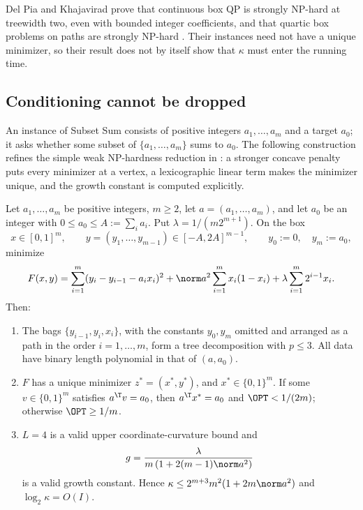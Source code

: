 Del Pia and Khajavirad prove that continuous box QP is strongly NP-hard at
treewidth two, even with bounded integer coefficients, and that quartic box
problems on paths are strongly NP-hard \cite{DelPiaKhajavirad2026}. Their
instances need not have a unique minimizer, so their result does not by
itself show that $\kappa$ must enter the running time.

\subsection{Conditioning cannot be dropped}\label{sec:limits-conditioning}

An instance of Subset Sum consists of positive integers $a_1,\ldots,a_m$ and
a target $a_0$; it asks whether some subset of $\{a_1,\ldots,a_m\}$ sums to
$a_0$. The following construction refines the simple weak NP-hardness
reduction in \cite[Remark~2]{DelPiaKhajavirad2026}: a stronger concave penalty
puts every minimizer at a vertex, a lexicographic linear term makes the
minimizer unique, and the growth constant is computed explicitly.

\begin{proposition}\label{lim:prop:unique}
Let $a_1,\ldots,a_m$ be positive integers, $m\ge2$, let $a=(a_1,\ldots,a_m)$,
and let $a_0$ be an integer with $0\le a_0\le A:=\sum_ia_i$. Put
$\lambda=1/(m2^{m+1})$. On the box
\[
x\in[0,1]^m,\qquad y=(y_1,\ldots,y_{m-1})\in[-A,2A]^{m-1},
\qquad y_0:=0,\quad y_m:=a_0,
\]
minimize
\[
F(x,y)=\sum_{i=1}^m(y_i-y_{i-1}-a_ix_i)^2
+\norm a^2\sum_{i=1}^mx_i(1-x_i)+\lambda\sum_{i=1}^m2^{i-1}x_i .
\]
Then:
\begin{enumerate}
\item The bags $\{y_{i-1},y_i,x_i\}$, with the constants $y_0,y_m$ omitted
  and arranged as a path in the order $i=1,\ldots,m$, form a tree
  decomposition with $p\le3$. All data have binary length polynomial in
  that of $(a,a_0)$.
\item $F$ has a unique minimizer $z^*=(x^*,y^*)$, and $x^*\in\{0,1\}^m$.
  If some $v\in\{0,1\}^m$ satisfies $a^{\T}v=a_0$, then
  $a^{\T}x^*=a_0$ and $\OPT<1/(2m)$; otherwise $\OPT\ge1/m$.
\item $L=4$ is a valid upper coordinate-curvature bound and
  \[
  g=\frac{\lambda}{m\,(1+2(m-1)\norm a^2)}
  \]
  is a valid growth constant. Hence
  $\kappa\le2^{m+3}m^2(1+2m\norm a^2)$ and $\log_2\kappa=O(I)$.
\end{enumerate}
\end{proposition}


